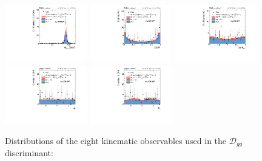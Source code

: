 \begin{figure}
\centering
\includegraphics[width=0.32\textwidth]{HZZ_Width/cCompare_DataMC_AllTeV_avgMZ_330.pdf}
\includegraphics[width=0.32\textwidth]{HZZ_Width/cCompare_DataMC_AllTeV_ZS_330.pdf} 
\includegraphics[width=0.32\textwidth]{HZZ_Width/cCompare_DataMC_AllTeV_h1h2_330.pdf} \\
\includegraphics[width=0.32\textwidth]{HZZ_Width/cCompare_DataMC_AllTeV_helphi_330.pdf}
\includegraphics[width=0.32\textwidth]{HZZ_Width/cCompare_DataMC_AllTeV_phi_330.pdf}
\caption[Distributions of the kinematic observables used in the $\mathcal{D}_{gg}$ discriminant:
$m_{Z_i}$, $\cos\theta^*$, $\cos\theta_{i}$, $\Phi$, and $\Phi_{1}$. The distributions for $m_{Z_{1}}$ and $m_{Z_{2}}$ and $\cos\theta_{1}$ and $\cos\theta_{2}$ are summed together. The observed data (points with error bars), the expectations for the SM background (shaded areas),
the SM Higgs boson signal (open areas under the solid histogram), and the Higgs boson width $\Gamma_{H} = 10 \times \Gamma_{H}^{\mathrm{SM}}$ are shown. The mass of the resonance is taken to be $\unit{125.6}{\GeV}$ and the gg enriched off resonance region is shown $m_{4\ell} > \unit{330}{\GeV}$.]{ Distributions of the eight kinematic observables used in the $\mathcal{D}_{gg}$ discriminant:
}
\end{figure}
